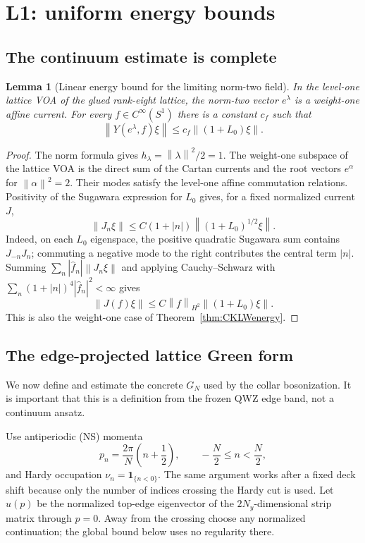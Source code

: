 \documentclass[11pt]{article}
\newtheorem{lemma}[theorem]{Lemma}
\theoremstyle{remark}
\newcommand{\id}{\mathbf 1}
\newcommand{\norm}[1]{\left\lVert#1\right\rVert}
\begin{document}
\section{L1: uniform energy bounds}
\label{sec:L1}

\subsection{The continuum estimate is complete}

\begin{lemma}[Linear energy bound for the limiting norm-two field]
\label{lem:continuumEB}
In the level-one lattice VOA of the glued rank-eight lattice, the
norm-two vector $e^\lambda$ is a weight-one affine current.  For every
$f\in C^\infty(S^1)$ there is a constant $c_f$ such that
\[
 \norm{Y(e^\lambda,f)\xi}
 \le c_f\norm{(1+L_0)\xi}.
\tag{4.1}\label{eq:continuumEB}
\]
\end{lemma}

\begin{proof}
The norm formula gives $h_\lambda=\norm{\lambda}^2/2=1$.
The weight-one subspace of the lattice VOA is the direct sum of the
Cartan currents and the root vectors $e^\alpha$ for
$\norm{\alpha}^2=2$.  Their modes satisfy the level-one affine
commutation relations.  Positivity of the Sugawara expression for $L_0$
gives, for a fixed normalized current $J$,
\[
 \norm{J_n\xi}
 \le C(1+|n|)\norm{(1+L_0)^{1/2}\xi}.
\tag{4.2}\label{eq:currentmode}
\]
Indeed, on each $L_0$ eigenspace, the positive quadratic Sugawara sum
contains $J_{-n}J_n$; commuting a negative mode to the right contributes
the central term $|n|$.  Summing
$\sum_n|\widehat f_n|\norm{J_n\xi}$ and applying Cauchy--Schwarz with
$\sum_n(1+|n|)^4|\widehat f_n|^2<\infty$ gives
\[
 \norm{J(f)\xi}
 \le C\norm{f}_{H^2}\norm{(1+L_0)\xi}.
\]
This is also the weight-one case of
Theorem~\ref{thm:CKLWenergy}.
\end{proof}

\subsection{The edge-projected lattice Green form}

We now define and estimate the concrete $G_N$ used by the collar
bosonization.  It is important that this is a definition from the frozen
QWZ edge band, not a continuum ansatz.

Use antiperiodic (NS) momenta
\[
 p_n=\frac{2\pi}{N}\left(n+\frac12\right),
 \qquad -\frac N2\le n<\frac N2,
\tag{4.3}\label{eq:NSmomenta}
\]
and Hardy occupation $\nu_n=\id_{\{n<0\}}$.  The same argument works
after a fixed deck shift because only the number of indices crossing the
Hardy cut is used.  Let $u(p)$ be the normalized top-edge eigenvector of
the $2N_y$-dimensional strip matrix through $p=0$.  Away from the
crossing choose any normalized continuation; the global bound below
uses no regularity there.
\end{document}
